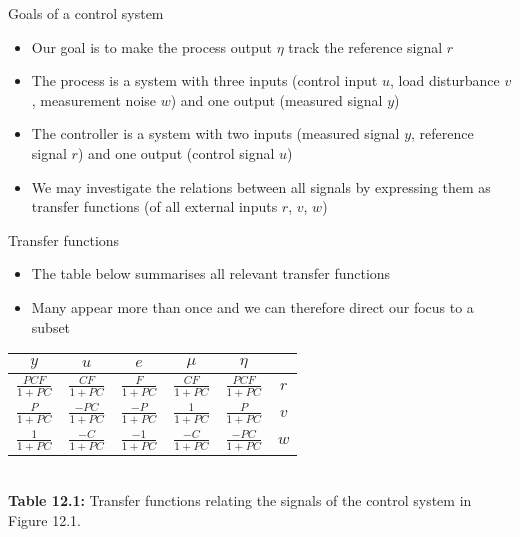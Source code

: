 \documentclass{beamer-control}
\begin{document}
\begin{frame}{Goals of a control system}
\begin{itemize}
	\item Our goal is to make the process output $\eta$ track the reference signal $r$
	\item The process is a system with three inputs (control input $u$, load disturbance $v$, measurement noise $w$) and one output (measured signal $y$)
	\item The controller is a system with two inputs (measured signal $y$, reference signal $r$)  and one output (control signal $u$)
	\item We may investigate the relations between all signals by expressing them as transfer functions (of all external inputs $r$, $v$, $w$)
\end{itemize}
\end{frame}


\begin{frame}{Transfer functions}
\begin{itemize}
	\item The table below summarises all relevant transfer functions
	\item Many appear more than once and we can therefore direct our focus to a subset
\end{itemize}

	\centering
	\Large{
	\begin{table}
		\begin{tabular}{ccccc| c}
			\hline $y$ & $u$ & $e$ & $\mu$ & $\eta$ & \\
			\hline $\frac{P C F}{1+P C}$ & $\frac{C F}{1+P C}$ & $\frac{F}{1+P C}$ & $\frac{C F}{1+P C}$ & $\frac{P C F}{1+P C}$ & $r$\\
			$\frac{P}{1+P C}$ & $\frac{-P C}{1+P C}$ & $\frac{-P}{1+P C}$ & $\frac{1}{1+P C}$ & $\frac{P}{1+P C}$ & $v$\\
			$\frac{1}{1+P C}$ & $\frac{-C}{1+P C}$ & $\frac{-1}{1+P C}$ & $\frac{-C}{1+P C}$ & $\frac{-P C}{1+P C}$ & $w$ \\
			\hline
		\end{tabular}\\
		\vspace{.5cm}
		\normalsize{\textbf{Table 12.1:} Transfer functions relating the signals of the control system in Figure 12.1.}
\end{table}}
\end{frame}

\end{document}
